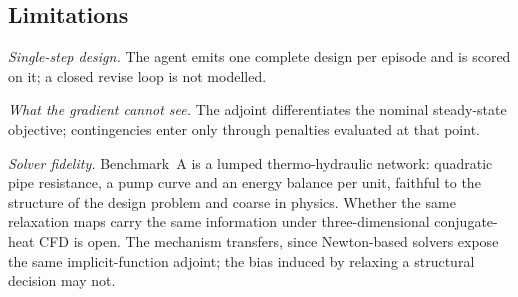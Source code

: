\documentclass[journal]{IEEEtran}
\begin{document}
\subsection{Limitations}
\emph{Single-step design.}  The agent emits one complete design per episode and
is scored on it; a closed revise loop is not modelled.

\emph{What the gradient cannot see.}  The adjoint differentiates the nominal
steady-state objective; contingencies enter only through penalties evaluated at
that point.

\emph{Solver fidelity.}  Benchmark~A is a lumped thermo-hydraulic network:
quadratic pipe resistance, a pump curve and an energy balance per unit, faithful
to the structure of the design problem and coarse in physics.  Whether the same
relaxation maps carry the same information under three-dimensional
conjugate-heat CFD is open.  The mechanism transfers, since Newton-based solvers
expose the same implicit-function adjoint; the bias induced by relaxing a
structural decision may not.
\end{document}
